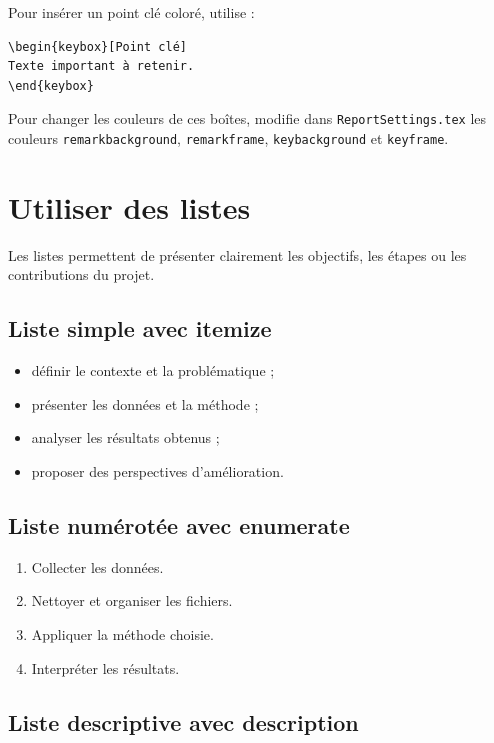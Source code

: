 Pour insérer un point clé coloré, utilise :

\begin{verbatim}
\begin{keybox}[Point clé]
Texte important à retenir.
\end{keybox}
\end{verbatim}

Pour changer les couleurs de ces boîtes, modifie dans \texttt{ReportSettings.tex} les couleurs \texttt{remarkbackground}, \texttt{remarkframe}, \texttt{keybackground} et \texttt{keyframe}.

\section{Utiliser des listes}

Les listes permettent de présenter clairement les objectifs, les étapes ou les contributions du projet.

\subsection{Liste simple avec itemize}

\begin{itemize}
  \item définir le contexte et la problématique ;
  \item présenter les données et la méthode ;
  \item analyser les résultats obtenus ;
  \item proposer des perspectives d'amélioration.
\end{itemize}

\subsection{Liste numérotée avec enumerate}

\begin{enumerate}
  \item Collecter les données.
  \item Nettoyer et organiser les fichiers.
  \item Appliquer la méthode choisie.
  \item Interpréter les résultats.
\end{enumerate}

\subsection{Liste descriptive avec description}

